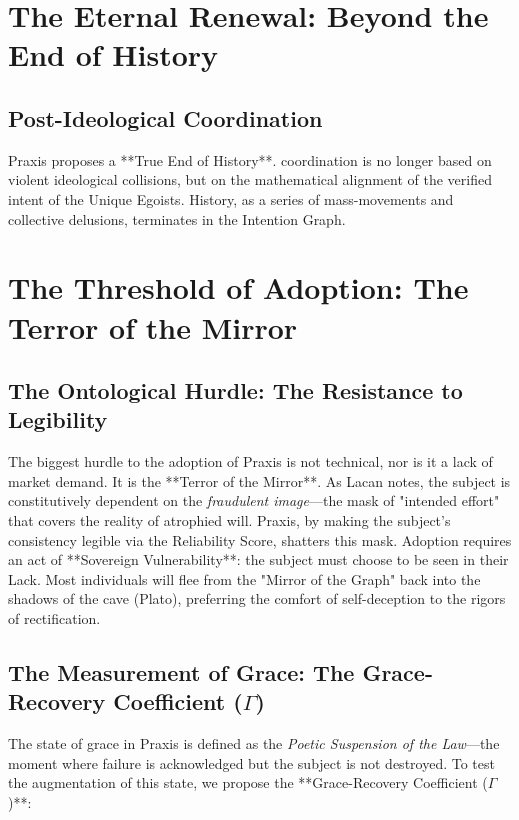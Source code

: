 \documentclass[12pt,a4paper,oneside]{report}
\begin{document}
\chapter{The Eternal Renewal: Beyond the End of History}

\section{Post-Ideological Coordination}
Praxis proposes a **True End of History**. coordination is no longer based on violent ideological collisions, but on the mathematical alignment of the verified intent of the Unique Egoists. History, as a series of mass-movements and collective delusions, terminates in the Intention Graph.

\chapter{The Threshold of Adoption: The Terror of the Mirror}

\section{The Ontological Hurdle: The Resistance to Legibility}
The biggest hurdle to the adoption of Praxis is not technical, nor is it a lack of market demand. It is the **Terror of the Mirror**. As Lacan notes, the subject is constitutively dependent on the \textit{fraudulent image}—the mask of "intended effort" that covers the reality of atrophied will. Praxis, by making the subject's consistency legible via the Reliability Score, shatters this mask. Adoption requires an act of **Sovereign Vulnerability**: the subject must choose to be seen in their Lack. Most individuals will flee from the "Mirror of the Graph" back into the shadows of the cave (Plato), preferring the comfort of self-deception to the rigors of rectification.

\section{The Measurement of Grace: The Grace-Recovery Coefficient ($\Gamma$)}
The state of grace in Praxis is defined as the \textit{Poetic Suspension of the Law}—the moment where failure is acknowledged but the subject is not destroyed. To test the augmentation of this state, we propose the **Grace-Recovery Coefficient ($\Gamma$)**:
\end{document}
